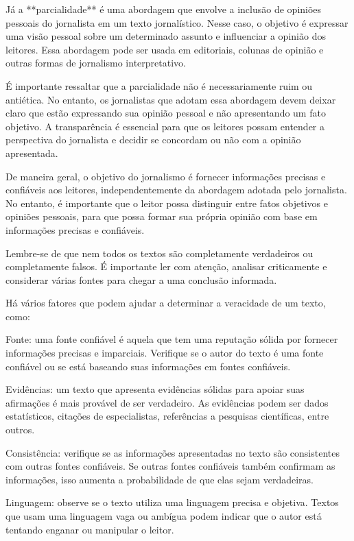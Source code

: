 {{Já a **parcialidade** é uma abordagem que envolve a inclusão de opiniões
pessoais do jornalista em um texto jornalístico. Nesse caso, o objetivo
é expressar uma visão pessoal sobre um determinado assunto e influenciar
a opinião dos leitores. Essa abordagem pode ser usada em editoriais,
colunas de opinião e outras formas de jornalismo interpretativo.

É importante ressaltar que a parcialidade não é necessariamente ruim ou
antiética. No entanto, os jornalistas que adotam essa abordagem devem
deixar claro que estão expressando sua opinião pessoal e não
apresentando um fato objetivo. A transparência é essencial para que os
leitores possam entender a perspectiva do jornalista e decidir se
concordam ou não com a opinião apresentada.

De maneira geral, o objetivo do jornalismo é fornecer informações
precisas e confiáveis aos leitores, independentemente da abordagem
adotada pelo jornalista. No entanto, é importante que o leitor possa
distinguir entre fatos objetivos e opiniões pessoais, para que possa
formar sua própria opinião com base em informações precisas e
confiáveis.

Lembre-se de que nem todos os textos são completamente verdadeiros ou
completamente falsos. É importante ler com atenção, analisar
criticamente e considerar várias fontes para chegar a uma conclusão
informada.

Há vários fatores que podem ajudar a determinar a veracidade de um
texto, como:

Fonte: uma fonte confiável é aquela que tem uma reputação
sólida por fornecer informações precisas e imparciais. Verifique se o
autor do texto é uma fonte confiável ou se está baseando suas
informações em fontes confiáveis.

Evidências: um texto que apresenta evidências sólidas para apoiar suas
afirmações é mais provável de ser verdadeiro. As evidências podem ser
dados estatísticos, citações de especialistas, referências a pesquisas
científicas, entre outros.

Consistência: verifique se as informações apresentadas no texto são
consistentes com outras fontes confiáveis. Se outras fontes confiáveis
também confirmam as informações, isso aumenta a probabilidade de que
elas sejam verdadeiras.

Linguagem: observe se o texto utiliza uma linguagem precisa e objetiva.
Textos que usam uma linguagem vaga ou ambígua podem indicar que o autor
está tentando enganar ou manipular o leitor.

}}

